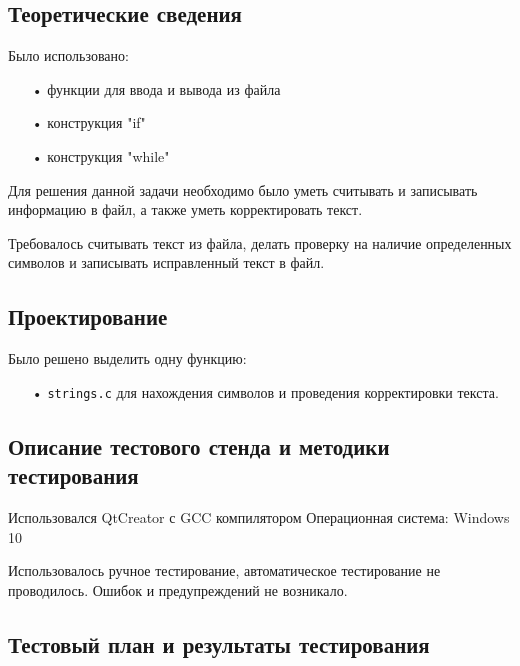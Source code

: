 \documentclass[12pt,a4paper]{report}
\begin{document}
\subsection{Теоретические сведения}

Было использовано:
\begin{enumerate}
\item[•] функции для ввода и вывода из файла
\item[•] конструкция "if"
\item[•] конструкция "while"
\end{enumerate}

Для решения данной задачи необходимо было уметь считывать и записывать информацию в файл, а также уметь корректировать текст.

Требовалось считывать текст из файла, делать проверку на наличие определенных символов и записывать исправленный текст в файл.

\subsection{Проектирование}

Было решено выделить одну функцию:
\begin{enumerate}
\item[•] \verb-strings.c- для нахождения символов и проведения корректировки текста.
\end{enumerate}


\subsection{Описание тестового стенда и методики тестирования}

Использовался QtCreator с GCC компилятором
Операционная система: Windows 10


Использовалось ручное тестирование, автоматическое тестирование не проводилось.
Ошибок и предупреждений не возникало.

\subsection{Тестовый план и результаты тестирования}
\end{document}
